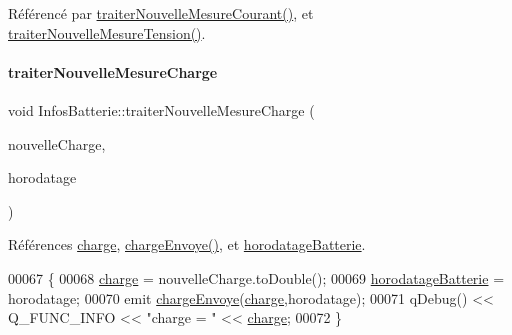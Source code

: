 Référencé par \hyperlink{class_infos_batterie_a7c127f1798ba279918b7b0783f9d23c4}{traiter\+Nouvelle\+Mesure\+Courant()}, et \hyperlink{class_infos_batterie_a8b1c1008d441b30f2cf38995fae3e0ca}{traiter\+Nouvelle\+Mesure\+Tension()}.

\mbox{\label{class_infos_batterie_a92c1afb1e022fe75cd7a0877d64e8d53}} 
\paragraph{\texorpdfstring{traiter\+Nouvelle\+Mesure\+Charge}{traiterNouvelleMesureCharge}}
{\footnotesize\ttfamily void Infos\+Batterie\+::traiter\+Nouvelle\+Mesure\+Charge (\begin{DoxyParamCaption}\item[{Q\+String}]{nouvelle\+Charge,  }\item[{Q\+String}]{horodatage }\end{DoxyParamCaption})\hspace{0.3cm}{\ttfamily [slot]}}



Références \hyperlink{class_infos_batterie_af3ad72cdbbf13f2dec6d81f078a2c0d2}{charge}, \hyperlink{class_infos_batterie_a75ef2e971d86ae3b66a787d53e3d5c63}{charge\+Envoye()}, et \hyperlink{class_infos_batterie_a261067aff87023bccd60e59961ef1ffc}{horodatage\+Batterie}.


\begin{DoxyCode}
00067 \{
00068     \hyperlink{class_infos_batterie_af3ad72cdbbf13f2dec6d81f078a2c0d2}{charge} = nouvelleCharge.toDouble();
00069     \hyperlink{class_infos_batterie_a261067aff87023bccd60e59961ef1ffc}{horodatageBatterie} = horodatage;
00070     emit \hyperlink{class_infos_batterie_a75ef2e971d86ae3b66a787d53e3d5c63}{chargeEnvoye}(\hyperlink{class_infos_batterie_af3ad72cdbbf13f2dec6d81f078a2c0d2}{charge},horodatage);
00071     qDebug() << Q\_FUNC\_INFO << \textcolor{stringliteral}{"charge = "} << \hyperlink{class_infos_batterie_af3ad72cdbbf13f2dec6d81f078a2c0d2}{charge};
00072 \}
\end{DoxyCode}
\mbox{\label{class_infos_batterie_a7c127f1798ba279918b7b0783f9d23c4}} 
